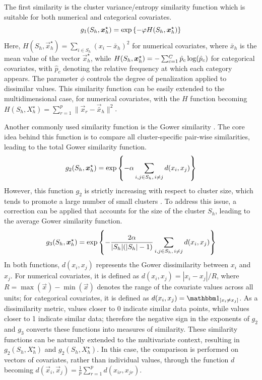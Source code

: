 \documentclass[12pt,	%
	a4paper,		%
	twoside,		%
	openright,		%
	titlepage,%
	]{book}
\theoremstyle{definition}
\let\cite\citep
\begin{document}
The first similarity is the cluster variance/entropy similarity function \cite{paper6} which is suitable for both numerical and categorical covariates. 
\begin{equation}    
g_1(S_h,\boldsymbol{x}_{h}^\star) = \exp \left\{ -\varphi H(S_h,\boldsymbol{x}_{h}^\star) \right\}
\end{equation}
Here, $H(S_h,\vec{x}_{h}^\star) = \sum_{i \in S_h} ( x_i - \bar{x}_h)^2 $ for numerical covariates, where $\bar x_h$ is the mean value of the vector $\vec{x}_{h}^\star$, while $H(S_h,\vec{x}_{h}^\star) = - \sum^{\raisebox{-0.4ex}{\scriptsize $C$}}_{c=1} %
\hat p_c \log(\hat p_c)$ for categorical covariates, with $\hat p_c$ denoting the relative frequency at which each category appears. The parameter $\phi$ controls the degree of penalization applied to dissimilar values. This similarity function can be easily extended to the multidimensional case, for numerical covariates, with the $H$ function becoming $H(S_h,X_{h}^\star) =  \sum_{r=1}^p \| \vec{x}_{r} - \vec{\bar{x}}_h \|^2$.


Another commonly used similarity function is the Gower similarity \cite{gower}. The core idea behind this function is to compare all cluster-specific pair-wise similarities, leading to the total Gower similarity function.
\begin{equation}    
g_2(S_h,\boldsymbol{x}_{h}^\star) = \exp \left\{ -\alpha \sum_{i,j \in S_h, \,i\neq j} d(x_i,x_j)  \right\}
\end{equation}
However, this function $g_2$ is strictly increasing with respect to cluster size, which tends to promote a large number of small clusters \cite{paper6}. To address this issue, a correction can be applied that accounts for the size of the cluster $S_h$, leading to the average Gower similarity function.
\begin{equation}    
g_3(S_h,\boldsymbol{x}_{h}^\star) = \exp \left\{ -\dfrac{2\alpha}{|S_h|(|S_h|-1)} \sum_{i,j \in S_h, \,i\neq j} d(x_i,x_j)  \right\}
\end{equation}
In both functions, $d(x_i,x_j)$ represents the Gower dissimilarity between $x_i$ and $x_j$. For numerical covariates, it is defined as $d(x_i,x_j) =  |x_i - x_j|/R$, where $R=\max(\vec{x}) - \min(\vec{x})$ denotes the range of the covariate values across all units; for categorical covariates, it is defined as $d(x_i,x_j) = \indicator{x_i \neq x_j}$. As a dissimilarity metric, values closer to 0 indicate similar data points, while values closer to 1 indicate similar data; therefore the negative sign in the exponents of $g_2$ and $g_3$ converts these functions into measures of similarity. These similarity functions can be naturally extended to the multivariate context, resulting in $g_2(S_h,X^\star_h)$ and $g_2(S_h,X^\star_h)$. In this case, the comparison is performed on vectors of covariates, rather than individual values, through the function $d$ becoming $d(\vec{x}_i,\vec{x}_j)=\frac{1}{p}\sum_{r=1}^p d(x_{ir},x_{jr})$.
\end{document}

